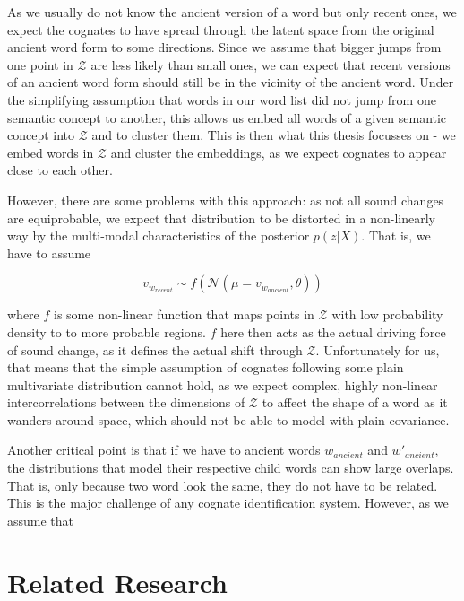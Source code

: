 \documentclass[8pt]{article}
\begin{document}
As we usually do not know the ancient version of a word but only recent ones, we expect the cognates to have spread through the latent space from the original ancient word form to some directions. Since we assume that bigger jumps from one point in $\mathcal{Z}$ are less likely than small ones, we can expect that recent versions of an ancient word form should still be in the vicinity of the ancient word. Under the simplifying assumption that words in our word list did not jump from one semantic concept to another, this allows us embed all words of a given semantic concept into $\mathcal{Z}$ and to cluster them. This is then what this thesis focusses on - we embed words in $\mathcal{Z}$ and cluster the embeddings, as we expect cognates to appear close to each other.

 However, there are some problems with this approach: as not all sound changes are equiprobable, we expect that distribution to be distorted in a non-linearly way by the multi-modal characteristics of the posterior $p(z|X)$. That is, we have to assume 

\begin{equation}
v_{w_{recent}} \sim f(\mathcal{N}(\mu = v_{w_{ancient}},\theta))
\end{equation}

where $f$ is some non-linear function that maps points in $\mathcal{Z}$ with low probability density to to more probable regions. $f$ here then acts as the actual driving force of sound change, as it defines the actual shift through $\mathcal{Z}$. Unfortunately for us, that means that the simple assumption of cognates following some plain multivariate distribution cannot hold, as we expect complex, highly non-linear intercorrelations between the dimensions of $\mathcal{Z}$ to affect the shape of a word as it wanders around space, which should not be able to model with plain covariance.

Another critical point is that if we have to ancient words $w_{ancient}$ and $w'_{ancient}$, the distributions that model their respective  child words can show large overlaps. That is, only because two word look the same, they do not have to be related. This is the major challenge of any cognate identification system. However, as we assume that 


\section{Related Research}
\end{document}
